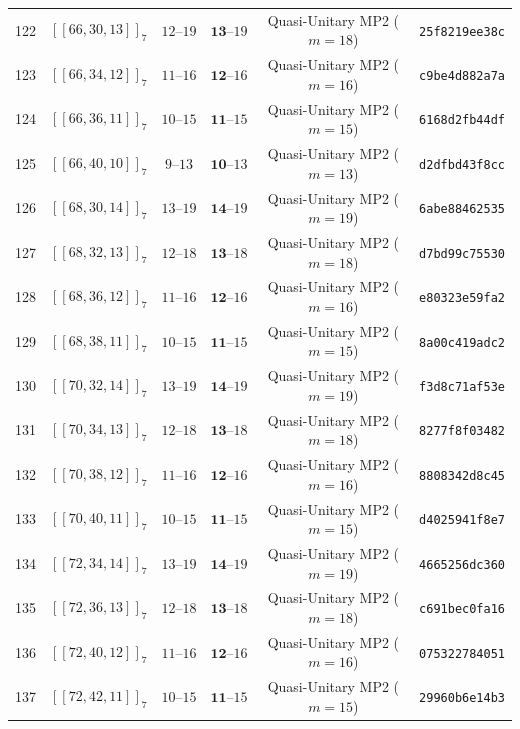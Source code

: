 \documentclass[11pt,a4paper]{article}
\theoremstyle{remark}
\begin{document}
{\begin{longtable}{@{}rccccl@{}}
122 & $[[66,30,13]]_{7}$ & $12\text{--}19$ & $\mathbf{13}\text{--}19$ & Quasi-Unitary MP2 ($m=18$) & \texttt{25f8219ee38c} \\
123 & $[[66,34,12]]_{7}$ & $11\text{--}16$ & $\mathbf{12}\text{--}16$ & Quasi-Unitary MP2 ($m=16$) & \texttt{c9be4d882a7a} \\
124 & $[[66,36,11]]_{7}$ & $10\text{--}15$ & $\mathbf{11}\text{--}15$ & Quasi-Unitary MP2 ($m=15$) & \texttt{6168d2fb44df} \\
125 & $[[66,40,10]]_{7}$ & $9\text{--}13$ & $\mathbf{10}\text{--}13$ & Quasi-Unitary MP2 ($m=13$) & \texttt{d2dfbd43f8cc} \\
126 & $[[68,30,14]]_{7}$ & $13\text{--}19$ & $\mathbf{14}\text{--}19$ & Quasi-Unitary MP2 ($m=19$) & \texttt{6abe88462535} \\
127 & $[[68,32,13]]_{7}$ & $12\text{--}18$ & $\mathbf{13}\text{--}18$ & Quasi-Unitary MP2 ($m=18$) & \texttt{d7bd99c75530} \\
128 & $[[68,36,12]]_{7}$ & $11\text{--}16$ & $\mathbf{12}\text{--}16$ & Quasi-Unitary MP2 ($m=16$) & \texttt{e80323e59fa2} \\
129 & $[[68,38,11]]_{7}$ & $10\text{--}15$ & $\mathbf{11}\text{--}15$ & Quasi-Unitary MP2 ($m=15$) & \texttt{8a00c419adc2} \\
130 & $[[70,32,14]]_{7}$ & $13\text{--}19$ & $\mathbf{14}\text{--}19$ & Quasi-Unitary MP2 ($m=19$) & \texttt{f3d8c71af53e} \\
131 & $[[70,34,13]]_{7}$ & $12\text{--}18$ & $\mathbf{13}\text{--}18$ & Quasi-Unitary MP2 ($m=18$) & \texttt{8277f8f03482} \\
132 & $[[70,38,12]]_{7}$ & $11\text{--}16$ & $\mathbf{12}\text{--}16$ & Quasi-Unitary MP2 ($m=16$) & \texttt{8808342d8c45} \\
133 & $[[70,40,11]]_{7}$ & $10\text{--}15$ & $\mathbf{11}\text{--}15$ & Quasi-Unitary MP2 ($m=15$) & \texttt{d4025941f8e7} \\
134 & $[[72,34,14]]_{7}$ & $13\text{--}19$ & $\mathbf{14}\text{--}19$ & Quasi-Unitary MP2 ($m=19$) & \texttt{4665256dc360} \\
135 & $[[72,36,13]]_{7}$ & $12\text{--}18$ & $\mathbf{13}\text{--}18$ & Quasi-Unitary MP2 ($m=18$) & \texttt{c691bec0fa16} \\
136 & $[[72,40,12]]_{7}$ & $11\text{--}16$ & $\mathbf{12}\text{--}16$ & Quasi-Unitary MP2 ($m=16$) & \texttt{075322784051} \\
137 & $[[72,42,11]]_{7}$ & $10\text{--}15$ & $\mathbf{11}\text{--}15$ & Quasi-Unitary MP2 ($m=15$) & \texttt{29960b6e14b3} \\

\end{longtable}}
\end{document}
